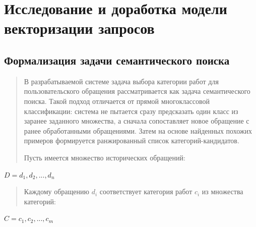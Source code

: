 \documentclass[
]{article}
\begin{document}
\hypertarget{ux438ux441ux441ux43bux435ux434ux43eux432ux430ux43dux438ux435-ux438-ux434ux43eux440ux430ux431ux43eux442ux43aux430-ux43cux43eux434ux435ux43bux438-ux432ux435ux43aux442ux43eux440ux438ux437ux430ux446ux438ux438-ux437ux430ux43fux440ux43eux441ux43eux432}{%
\section{Исследование и доработка модели векторизации
запросов}\label{ux438ux441ux441ux43bux435ux434ux43eux432ux430ux43dux438ux435-ux438-ux434ux43eux440ux430ux431ux43eux442ux43aux430-ux43cux43eux434ux435ux43bux438-ux432ux435ux43aux442ux43eux440ux438ux437ux430ux446ux438ux438-ux437ux430ux43fux440ux43eux441ux43eux432}}

\hypertarget{ux444ux43eux440ux43cux430ux43bux438ux437ux430ux446ux438ux44f-ux437ux430ux434ux430ux447ux438-ux441ux435ux43cux430ux43dux442ux438ux447ux435ux441ux43aux43eux433ux43e-ux43fux43eux438ux441ux43aux430}{%
\subsection{\texorpdfstring{Формализация задачи семантического поиска
}{Формализация задачи семантического поиска }}\label{ux444ux43eux440ux43cux430ux43bux438ux437ux430ux446ux438ux44f-ux437ux430ux434ux430ux447ux438-ux441ux435ux43cux430ux43dux442ux438ux447ux435ux441ux43aux43eux433ux43e-ux43fux43eux438ux441ux43aux430}}

\begin{quote}
В разрабатываемой системе задача выбора категории работ для
пользовательского обращения рассматривается как задача семантического
поиска. Такой подход отличается от прямой многоклассовой классификации:
система не пытается сразу предсказать один класс из заранее заданного
множества, а сначала сопоставляет новое обращение с ранее обработанными
обращениями. Затем на основе найденных похожих примеров формируется
ранжированный список категорий-кандидатов.

Пусть имеется множество исторических обращений:
\end{quote}

\(D = d_{1},d_{2},...,d_{n}\)

\begin{quote}
Каждому обращению \(d_{i}\) соответствует категория работ \(c_{i}\) из
множества категорий:
\end{quote}

\(C = c_{1},c_{2},...,c_{m}\)
\end{document}
